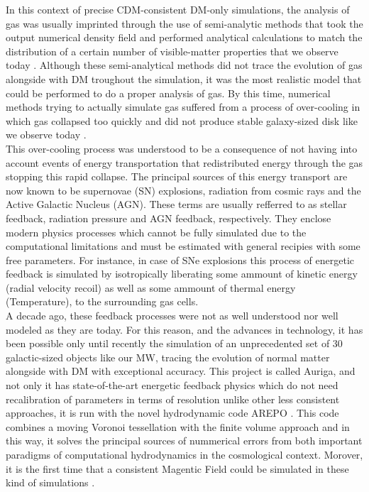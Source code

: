 In this context of precise CDM-consistent DM-only simulations, the analysis of gas was usually imprinted through the use of semi-analytic methods that took the output numerical density field and performed analytical calculations to match the distribution of a certain number of visible-matter properties that we observe today \cite{Analytical methods}. Although these semi-analytical methods did not trace the evolution of gas alongside with DM troughout the simulation, it was the most realistic model that could be performed to do a proper analysis of gas. By this time, numerical methods trying to actually simulate gas suffered from a process of over-cooling in which gas collapsed too quickly and did not produce stable galaxy-sized disk like we observe today \cite{cooling}.\\

This over-cooling process was understood to be a consequence of not having into account events of energy transportation that redistributed energy through the gas stopping this rapid collapse. The principal sources of this energy transport are now known to be supernovae (SN) explosions, radiation from cosmic rays and the Active Galactic Nucleus (AGN). These terms are usually refferred to as stellar feedback, radiation pressure and AGN feedback, respectively. They enclose modern physics processes which cannot be fully simulated due to the computational limitations and must be estimated with general recipies with some free parameters. For instance, in case of SNe explosions this process of energetic feedback is simulated by isotropically liberating some ammount of kinetic energy (radial velocity recoil) as well as some ammount of thermal energy (Temperature), to the surrounding gas cells. \\

 A decade ago, these feedback processes were not as well understood nor well modeled as they are today. For this reason, and the advances in technology, it has been possible only until recently the simulation of an unprecedented set of 30 galactic-sized objects like our MW, tracing the evolution of normal matter alongside with DM with exceptional accuracy. This project is called Auriga, \cite{Auriga} and not only it has state-of-the-art energetic feedback physics which do not need recalibration of parameters in terms of resolution unlike other less consistent approaches, it is run with the novel hydrodynamic code AREPO
\cite{Arepo}. This code combines a moving Voronoi tessellation with the
finite volume approach and in this way, it solves the principal sources of nummerical errors from both important paradigms of computational hydrodynamics in the cosmological context. Morover, it is the first time that a consistent Magentic Field could be simulated in these kind of simulations \cite{parkmorr}.\\
 

